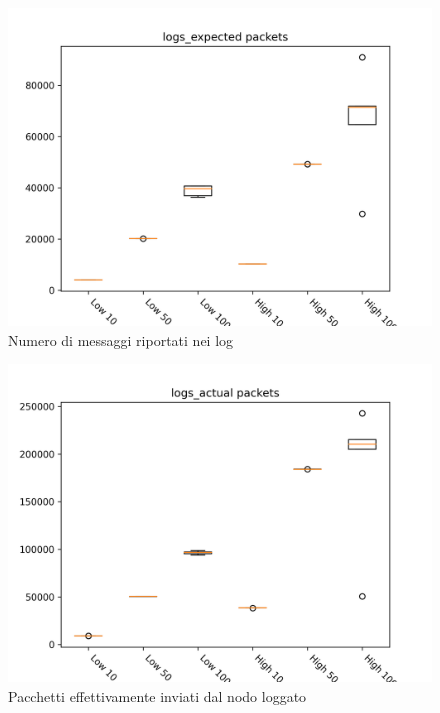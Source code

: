 \documentclass[target=bach]{thud}
\begin{document}
\begin{figure}[H]
    \includegraphics[width=\linewidth, height=0.4\textheight, keepaspectratio]{graphs/logs_expected packets.png}
    \caption{Numero di messaggi riportati nei log}
    \label{fig:lep}
\end{figure}

\begin{figure}[H]
    \includegraphics[width=\linewidth, height=0.4\textheight, keepaspectratio]{graphs/logs_actual packets.png}
    \caption{Pacchetti effettivamente inviati dal nodo loggato}
    \label{fig:lap}
\end{figure}

\backmatter



\end{document}
